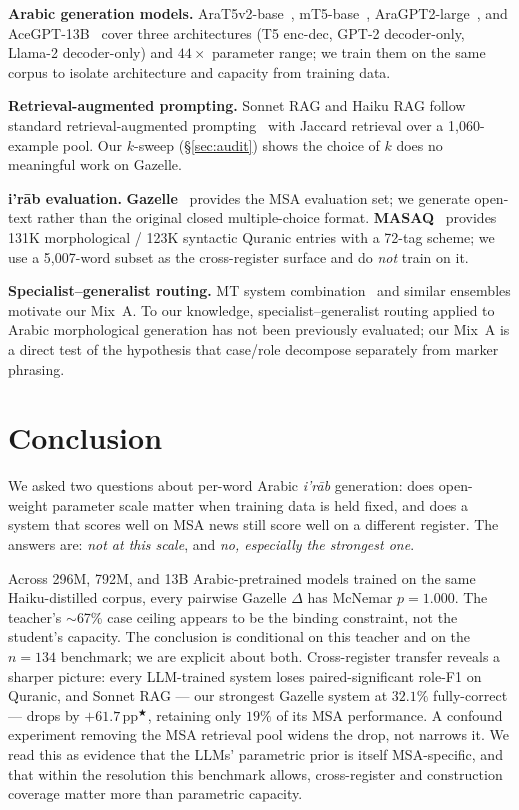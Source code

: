 \documentclass[10pt,a4paper,twocolumn]{article}
\newcommand{\sig}{\ensuremath{^{\bigstar}}}
\newcommand{\irab}{\textit{i'r{\=a}b}}
\begin{document}
\textbf{Arabic generation models.}
AraT5v2-base~\cite{nagoudi2023arat5}, mT5-base~\cite{xue2021mt5}, AraGPT2-large~\cite{antoun2021aragpt2}, and AceGPT-13B~\cite{huang2024acegpt} cover three architectures (T5 enc-dec, GPT-2 decoder-only, Llama-2 decoder-only) and $44\times$ parameter range; we train them on the same corpus to isolate architecture and capacity from training data.

\textbf{Retrieval-augmented prompting.}
Sonnet RAG and Haiku RAG follow standard retrieval-augmented prompting~\cite{lewis2020rag} with Jaccard retrieval over a 1{,}060-example pool. Our $k$-sweep (\S\ref{sec:audit}) shows the choice of $k$ does no meaningful work on Gazelle.

\textbf{i'r\=ab evaluation.}
\textbf{Gazelle}~\cite{hijjawi2024gazelle} provides the MSA evaluation set; we generate open-text rather than the original closed multiple-choice format. \textbf{MASAQ}~\cite{sawalha2025masaq} provides 131K morphological / 123K syntactic Quranic entries with a 72-tag scheme; we use a 5{,}007-word subset as the cross-register surface and do \emph{not} train on it.

\textbf{Specialist--generalist routing.}
MT system combination~\cite{rosti2007combination} and similar ensembles motivate our Mix~A. To our knowledge, specialist--generalist routing applied to Arabic morphological generation has not been previously evaluated; our Mix~A is a direct test of the hypothesis that case/role decompose separately from marker phrasing.

\section{Conclusion}
\label{sec:conclusion}

We asked two questions about per-word Arabic \irab{} generation: does open-weight parameter scale matter when training data is held fixed, and does a system that scores well on MSA news still score well on a different register. The answers are: \emph{not at this scale}, and \emph{no, especially the strongest one}.

Across 296M, 792M, and 13B Arabic-pretrained models trained on the same Haiku-distilled corpus, every pairwise Gazelle $\Delta$ has McNemar $p{=}1.000$. The teacher's $\sim$67\% case ceiling appears to be the binding constraint, not the student's capacity. The conclusion is conditional on this teacher and on the $n{=}134$ benchmark; we are explicit about both. Cross-register transfer reveals a sharper picture: every LLM-trained system loses paired-significant role-F1 on Quranic, and Sonnet RAG --- our strongest Gazelle system at $32.1\%$ fully-correct --- drops by $+61.7$\,pp\sig{}, retaining only $19\%$ of its MSA performance. A confound experiment removing the MSA retrieval pool widens the drop, not narrows it. We read this as evidence that the LLMs' parametric prior is itself MSA-specific, and that within the resolution this benchmark allows, cross-register and construction coverage matter more than parametric capacity.
\end{document}
